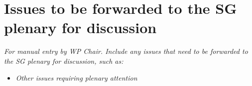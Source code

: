 
\section{Issues to be forwarded to the SG\studyGroup{} plenary for discussion}\label{issues-for-plenary}

\textit{For manual entry by WP Chair. Include any issues that need to be forwarded to the SG plenary for discussion, such as:}
\begin{itemize}
    \item \textit{Other issues requiring plenary attention}
\end{itemize}
